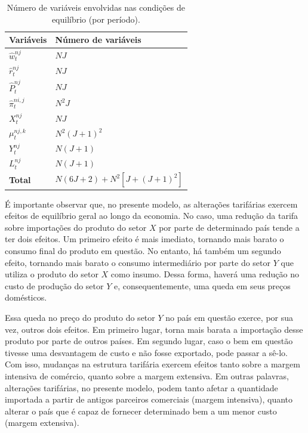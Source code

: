 \documentclass{article}
\begin{document}
\begin{center}
\begin{table}[ht]
\caption{Número de variáveis envolvidas nas condições de equilíbrio (por período).}
\begin{center}
\begin{tabular}{ll}
\hline 
    \textbf{Variáveis} & \textbf{Número de variáveis}\tabularnewline
\hline 
    $\hat{w}_t^{nj}$ & $NJ$ \tabularnewline
    
    $\hat{r}_t^{nj}$ & $NJ$ \tabularnewline
    
    $\hat{P}_t^{nj}$ & $NJ$ \tabularnewline
    
    $\hat{\pi}_t^{ni,j}$ & $N^2J$ \tabularnewline
    
    $X_t^{nj}$ & $NJ$ \tabularnewline
    
    $\mu_t^{nj,k}$ & $N^2 (J+1)^2$ \tabularnewline
    
    $Y_t^{nj}$ & $N(J+1)$ \tabularnewline
    
    $L_t^{nj}$ & $N(J+1)$ \tabularnewline
    
\hline 

    \textbf{Total} & \textbf{$N(6J+2)+N^2 [J+(J+1)^2]$} \tabularnewline
\hline    
\end{tabular}
\end{center}
\end{table}
\end{center}

É importante observar que, no presente modelo, as alterações tarifárias exercem efeitos de equilíbrio geral ao longo da economia. No caso, uma redução da tarifa sobre importações do produto do setor $X$ por parte de determinado país tende a ter dois efeitos. Um primeiro efeito é mais imediato, tornando mais barato o consumo final do produto em questão. No entanto, há também um segundo efeito, tornando mais barato o consumo intermediário por parte do setor $Y$ que utiliza o produto do setor $X$ como insumo. Dessa forma, haverá uma redução no custo de produção do setor $Y$ e, consequentemente, uma queda em seus preços domésticos.

Essa queda no preço do produto do setor $Y$ no país em questão exerce, por sua vez, outros dois efeitos. Em primeiro lugar, torna mais barata a importação desse produto por parte de outros países. Em segundo lugar, caso o bem em questão tivesse uma desvantagem de custo e não fosse exportado, pode passar a sê-lo. Com isso, mudanças na estrutura tarifária exercem efeitos tanto sobre a margem intensiva de comércio, quanto sobre a margem extensiva. Em outras palavras, alterações tarifárias, no presente modelo, podem tanto afetar a quantidade importada a partir de antigos parceiros comerciais (margem intensiva), quanto alterar o país que é capaz de fornecer determinado bem a um menor custo (margem extensiva).  
\end{document}
